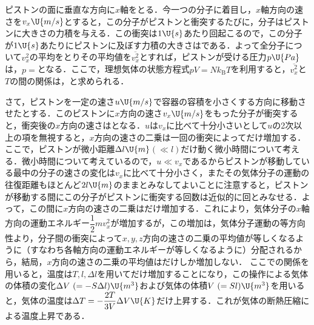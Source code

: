 \hspace{1zw}ピストンの面に垂直な方向に$x$軸をとる．今一つの分子に着目し，$x$軸方向の速さを$v_x\U{m/s}$とすると，この分子がピストンと衝突するたびに，分子はピストンに大きさの力積を与える．この衝突は$1\U{s}$あたり回起こるので，この分子が$1\U{s}$あたりにピストンに及ぼす力積の大きさはである．よって全分子について$v_x^2$の平均をとりその平均値を$\overline{v_x^2}$とすれば，ピストンが受ける圧力$p\U{Pa}$は，$p=$となる．ここで，理想気体の状態方程式$pV=Nk_{\mathrm{B}}T$を利用すると，$\overline{v_x^2}$と$T$の間の関係は，と求められる．

\hspace{1zw}さて，ピストンを一定の速さ$u\U{m/s}$で容器の容積を小さくする方向に移動させたとする．このピストンに$x$方向の速さ$v_x\U{m/s}$をもった分子が衝突すると，衝突後の$x$方向の速さはとなる．$u$は$v_x$に比べて十分小さいとして$u$の2次以上の項を無視すると，$x$方向の速さの二乗は一回の衝突によってだけ増加する．ここで，ピストンが微小距離$\Delta l\U{m}$$(\ll l)$だけ動く微小時間について考える．微小時間について考えているので，$u\ll v_x$であるからピストンが移動している最中の分子の速さの変化は$v_x$に比べて十分小さく，またその気体分子の運動の往復距離もほとんど$2l\U{m}$のままとみなしてよいことに注意すると，ピストンが移動する間にこの分子がピストンに衝突する回数は近似的に回とみなせる．よって，この間に$x$方向の速さの二乗はだけ増加する．これにより，気体分子の$x$軸方向の運動エネルギー$\dfrac{1}{2}mv_x^2$が増加するが，この増加は，気体分子運動の等方向性より，分子間の衝突によって$x, y, z$方向の速さの二乗の平均値が等しくなるように（すなわち各軸方向の運動エネルギーが等しくなるように）分配されるから，結局，$x$方向の速さの二乗の平均値はだけしか増加しない．
ここでの関係を用いると，温度は$T, l, \Delta l$を用いてだけ増加することになり，この操作による気体の体積の変化$\Delta V\ (=-S\Delta l)\U{m^3}$および気体の体積$V\ (=Sl)\U{m^3}$を用いると，気体の温度は$\Delta T=-\dfrac{2T}{3V}\Delta V\U{K}$だけ上昇する．これが気体の断熱圧縮による温度上昇である．

\newpage

